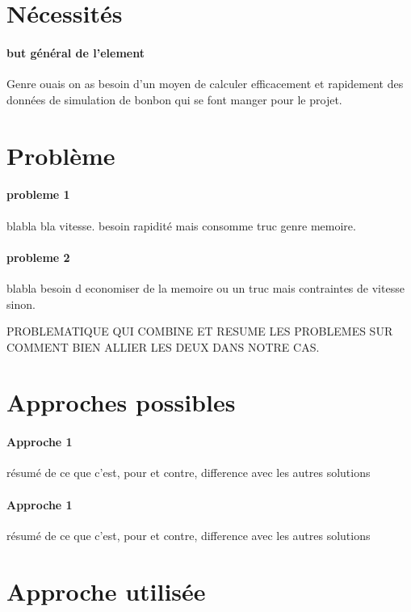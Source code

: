 	\section{Nécessités}
	
		\paragraph{but général de l'element}
		Genre ouais on as besoin d'un moyen de calculer efficacement et rapidement des données de simulation de bonbon qui se font manger pour le projet.
		
	
	\section{Problème}
	
		\paragraph{probleme 1}
		blabla bla vitesse. besoin rapidité mais consomme truc genre memoire.
		
		\paragraph{probleme 2}
		blabla besoin d economiser de la memoire ou un truc mais contraintes de vitesse sinon.
		
		\begin{problem}
			PROBLEMATIQUE QUI COMBINE ET RESUME LES PROBLEMES SUR COMMENT BIEN ALLIER LES DEUX DANS NOTRE CAS.
		\end{problem}
	
	\section{Approches possibles}
	
		\paragraph{Approche 1}
		résumé de ce que c'est, pour et contre, difference avec les autres solutions
		
		
		\paragraph{Approche 1}
		résumé de ce que c'est, pour et contre, difference avec les autres solutions
	
	\section{Approche utilisée}
		
